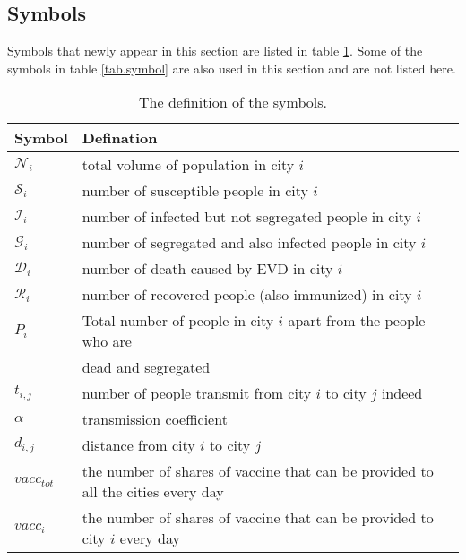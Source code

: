 \subsection{Symbols}
Symbols that newly appear in this section are listed in table \ref{tab.symbol2}. Some of the symbols in table \ref{tab.symbol} are also used in this section and are not listed here.
\begin{table}[htbp]
	\centering
	\begin{tabular}{|l|l|}
		\hline
		Symbol & Defination \\
		\hline
		$\mathcal{N}_i$ & total volume of population in city $i$\\

		$\mathcal{S}_i$ & number of susceptible people in city $i$\\

		$\mathcal{I}_i$ & number of infected but not segregated people in city $i$\\

		$\mathcal{G}_i$ & number of segregated and also infected people in city $i$\\

		$\mathcal{D}_i$ & number of death caused by EVD in city $i$\\

		$\mathcal{R}_i$ & number of recovered people (also immunized) in city $i$\\

		\textbf{$P_{i}$} & Total number of people in city $i$ apart from the people who are \\ & dead and segregated \\

		\textbf{$t_{i,j}$} & number of people transmit from city $i$ to city $j$ indeed \\

		\textbf{$\alpha$} & transmission coefficient \\

		\textbf{$d_{i,j}$} & distance from city $i$ to city $j$ \\

		$vacc_{tot}$ & the number of shares of vaccine that can be provided to all the cities every day\\

		$vacc_{i}$ & the number of shares of vaccine that can be provided to city $i$ every day\\
		\hline
	\end{tabular}
	\caption{The definition of the symbols.}  \label{tab.symbol2}
\end{table}

